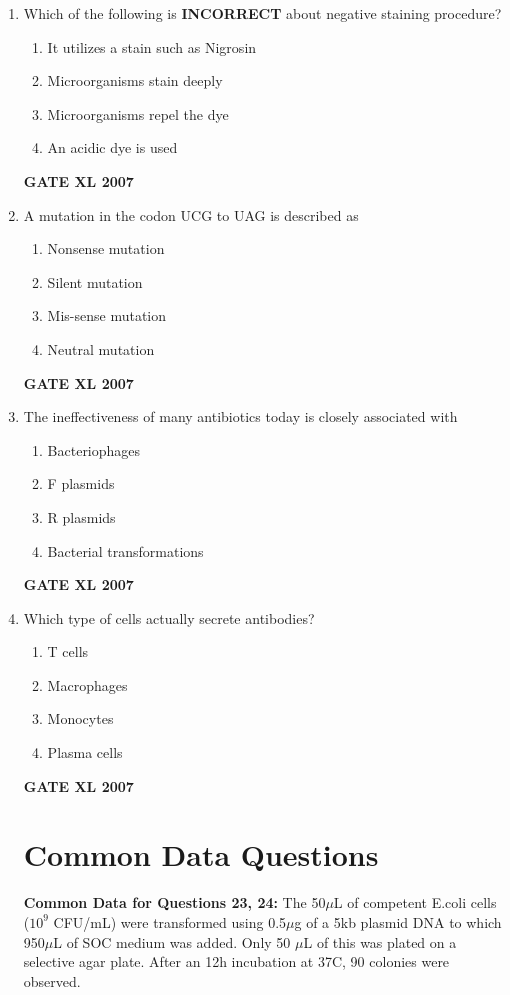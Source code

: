 \documentclass[journal,12pt,onecolumn]{IEEEtran}
\begin{document}
\begin{enumerate}
\item Which of the following is \textbf{INCORRECT} about negative staining procedure?
\begin{enumerate}
    \item It utilizes a stain such as Nigrosin
    \item Microorganisms stain deeply
    \item Microorganisms repel the dye
    \item An acidic dye is used
\end{enumerate}\hfill{\textbf{GATE XL 2007}}

\item A mutation in the codon UCG to UAG is described as
\begin{enumerate}
    \item Nonsense mutation
    \item Silent mutation
    \item Mis-sense mutation
    \item Neutral mutation
\end{enumerate}\hfill{\textbf{GATE XL 2007}}

\item The ineffectiveness of many antibiotics today is closely associated with
\begin{enumerate}
    \item Bacteriophages
    \item F plasmids
    \item R plasmids
    \item Bacterial transformations
\end{enumerate}\hfill{\textbf{GATE XL 2007}}

\item Which type of cells actually secrete antibodies?
\begin{enumerate}
    \item T cells
    \item Macrophages
    \item Monocytes
    \item Plasma cells
\end{enumerate}\hfill{\textbf{GATE XL 2007}}

\vspace{1em}
\section*{Common Data Questions}

\textbf{Common Data for Questions 23, 24:}
The 50$\mu$L of competent E.coli cells ($10^9$ CFU/mL) were transformed using 0.5$\mu$g of a 5kb plasmid DNA to which 950$\mu$L of SOC medium was added. Only 50 $\mu$L of this was plated on a selective agar plate. After an 12h incubation at 37\textdegree C, 90 colonies were observed.


\end{enumerate}
\end{document}
